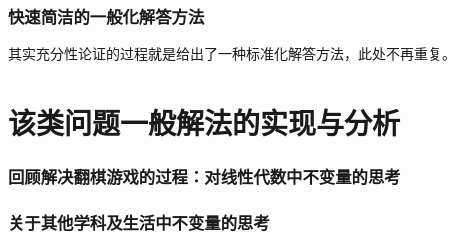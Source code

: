 \documentclass[UTF-8,a4paper]{ctexart}
\begin{document}
\section{快速简洁的一般化解答方法}
其实充分性论证的过程就是给出了一种标准化解答方法，此处不再重复。


\part{该类问题一般解法的实现与分析}
\section{回顾解决翻棋游戏的过程：对线性代数中不变量的思考}
\section{关于其他学科及生活中不变量的思考}
\end{document}
